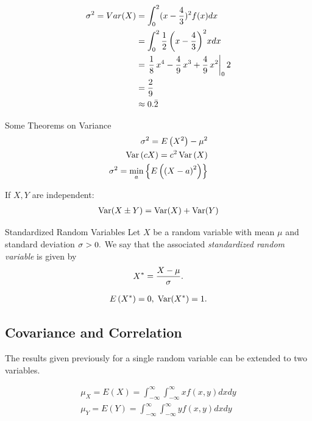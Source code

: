 {}
\begin{align}
 \sigma^2 = Var(X) &= \displaystyle \int_{0}^{2}(x-\frac{4}{3})^2f(x) dx
 \\  &= \displaystyle \int_{0}^{2} \frac{1}{2} \, {\left(x - \frac{4}{3}\right)}^{2} x dx
 \\  &= \displaystyle
 \left. \frac{1}{8} \, x^{4} - \frac{4}{9} \, x^{3} + \frac{4}{9} \, x^{2} \right|_{0}{2}
 \\  &= \displaystyle \frac{2}{9}
\\  &\approx \displaystyle 0.\bar{2}
\end{align}

{Some Theorems on Variance}
\begin{align}
 \label{eq:2.9.14}
 \sigma^{2}=E\left( X^{2} \right)-\mu^{2} \\ 
 \label{eq:2.9.15}
 \operatorname{Var}\left( cX \right)=c^{2}\operatorname{Var}\left( X \right)\\ 
 \label{thm:2.9.3}
 \sigma^{2}=\min_{a}\left\{ E\left( \left( X-a \right)^{2} \right) \right\}
\end{align}

If $X,Y$ are independent:
\begin{align}
 \label{eq:2.9.16}
 \operatorname{Var}(X\pm Y)=\operatorname{Var}(X)+\operatorname{Var}(Y)
\end{align}

{Standardized Random Variables}
 Let $X$ be a random variable with mean $\mu$ and standard deviation $\sigma>0.$ We say that the associated \emph{standardized random variable} is given by
 \begin{align}
  \label{eq:2.9.17}
  X^{*}=\dfrac{X-\mu}{\sigma}.
 \end{align}

\begin{align}
 \label{eq:2.9.18}
 E\left( X^{*} \right)=0, \; \operatorname{Var}(X^{*})=1.
\end{align}

\subsection{Covariance and Correlation}

The results given previously for a single random variable can be extended to two variables.

{}

\[
 \label{eq:2.9.19}
 \begin{split}
  \mu_{X}=E(X)=\int_{-\infty}^{\infty}\int_{-\infty}^{\infty} xf(x,y)dxdy\\ 
  \mu_{Y}=E(Y)=\int_{-\infty}^{\infty}\int_{-\infty}^{\infty}
  yf(x,y)dxdy
 \end{split}
\]

